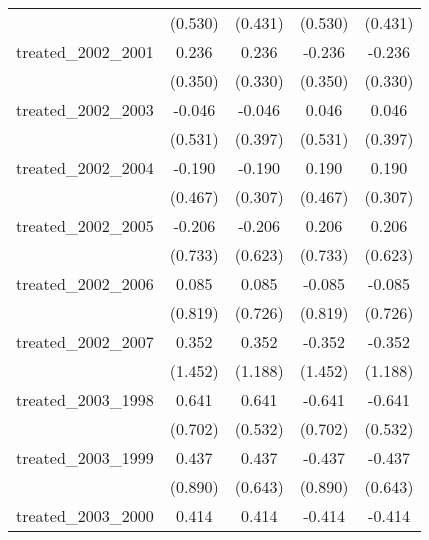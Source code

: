 {\begin{tabular}{l*{4}{c}}
            &     (0.530)         &     (0.431)         &     (0.530)         &     (0.431)         \\
[1em]
treated\_2002\_2001&       0.236         &       0.236         &      -0.236         &      -0.236         \\
            &     (0.350)         &     (0.330)         &     (0.350)         &     (0.330)         \\
[1em]
treated\_2002\_2003&      -0.046         &      -0.046         &       0.046         &       0.046         \\
            &     (0.531)         &     (0.397)         &     (0.531)         &     (0.397)         \\
[1em]
treated\_2002\_2004&      -0.190         &      -0.190         &       0.190         &       0.190         \\
            &     (0.467)         &     (0.307)         &     (0.467)         &     (0.307)         \\
[1em]
treated\_2002\_2005&      -0.206         &      -0.206         &       0.206         &       0.206         \\
            &     (0.733)         &     (0.623)         &     (0.733)         &     (0.623)         \\
[1em]
treated\_2002\_2006&       0.085         &       0.085         &      -0.085         &      -0.085         \\
            &     (0.819)         &     (0.726)         &     (0.819)         &     (0.726)         \\
[1em]
treated\_2002\_2007&       0.352         &       0.352         &      -0.352         &      -0.352         \\
            &     (1.452)         &     (1.188)         &     (1.452)         &     (1.188)         \\
[1em]
treated\_2003\_1998&       0.641         &       0.641         &      -0.641         &      -0.641         \\
            &     (0.702)         &     (0.532)         &     (0.702)         &     (0.532)         \\
[1em]
treated\_2003\_1999&       0.437         &       0.437         &      -0.437         &      -0.437         \\
            &     (0.890)         &     (0.643)         &     (0.890)         &     (0.643)         \\
[1em]
treated\_2003\_2000&       0.414         &       0.414         &      -0.414         &      -0.414         \\

\end{tabular}}
